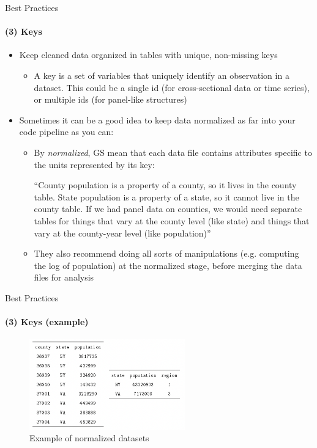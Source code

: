 \documentclass[10pt, aspectratio=169, xcolor=dvipsnames]{beamer}
\let\olditem\item
\renewcommand{\item}{%
\olditem\vspace{0.3em}}
\begin{document}
\begin{frame}[t]{Best Practices}
    \framesubtitle{(3) Keys}

    \normalsize\vspace{0.5em} \begin{itemize}
        \item Keep cleaned data organized in tables with unique, non-missing keys \begin{itemize}
            \item A key is a set of variables that uniquely identify an observation in a dataset. This could be a single id (for cross-sectional data or time series), or multiple ids (for panel-like structures)
        \end{itemize}
        \item Sometimes it can be a good idea to keep data normalized as far into your code pipeline as you can: \begin{itemize}
            \item By \textit{normalized}, GS mean that each data file contains attributes specific to the units represented by its key: 
            
            \qquad ``County population is a property of a county, so it lives in the county table. State population is a property of a state, so it cannot live in the county table. If we had panel data on counties, we would need separate tables for things that vary at the county level (like state) and things that vary at the county-year level (like population)''
            \item They also recommend doing all sorts of manipulations (e.g. computing the log of population) at the normalized stage, before merging the data files for analysis
        \end{itemize}
    \end{itemize}
\end{frame}

\begin{frame}[t]{Best Practices}
    \framesubtitle{(3) Keys (example)}

    \normalsize\vspace{0.5em} \begin{figure}
        \centering
        \caption{Example of normalized datasets}
        \includegraphics[width=0.6\textwidth]{normtable.png}
    \end{figure}
\end{frame}
\end{document}

